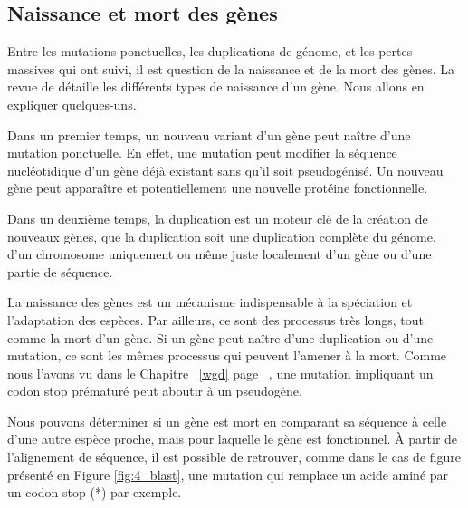 \subsection{Naissance et mort des gènes}\label{naissance}
\par Entre les mutations ponctuelles, les duplications de génome, et les pertes massives qui ont suivi, il est question de la naissance et de la mort des gènes. La revue de \cite{kaessmann_origins_2010} détaille les différents types de naissance d’un gène. Nous allons en expliquer quelques-uns. 
\par Dans un premier temps, un nouveau variant d’un gène peut naître d’une mutation ponctuelle. En effet, une mutation peut modifier la séquence nucléotidique d’un gène déjà existant sans qu’il soit pseudogénisé. Un nouveau gène peut apparaître et potentiellement une nouvelle protéine fonctionnelle. 
\par Dans un deuxième temps, la duplication est un moteur clé de la création de nouveaux gènes, que la duplication soit une duplication complète du génome, d’un chromosome uniquement ou même juste localement d’un gène ou d’une partie de séquence. 
\par La naissance des gènes est un mécanisme indispensable à la spéciation et l’adaptation des espèces. Par ailleurs, ce sont des processus très longs, tout comme la mort d’un gène. Si un gène peut naître d’une duplication ou d’une mutation, ce sont les mêmes processus qui peuvent l’amener à la mort. Comme nous l’avons vu dans le Chapitre ~\ref{wgd} page ~\pageref{wgd}, une mutation impliquant un codon stop prématuré peut aboutir à un pseudogène. 
\par Nous pouvons déterminer si un gène est mort en comparant sa séquence à celle d’une autre espèce proche, mais pour laquelle le gène est fonctionnel. À partir de l’alignement de séquence, il est possible de retrouver, comme dans le cas de figure présenté en Figure \ref{fig:4_blast}, une mutation qui remplace un acide aminé par un codon stop (*) par exemple. \newpage

